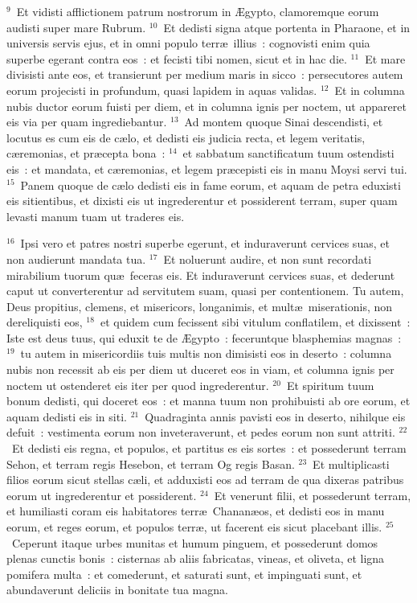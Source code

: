 ${}^{9}$~Et vidisti afflictionem patrum nostrorum in \AE gypto, clamoremque eorum audisti super mare Rubrum.
${}^{10}$~Et dedisti signa atque portenta in Pharaone, et in universis servis ejus, et in omni populo terr\ae\ illius~: cognovisti enim quia superbe egerant contra eos~: et fecisti tibi nomen, sicut et in hac die.
${}^{11}$~Et mare divisisti ante eos, et transierunt per medium maris in sicco~: persecutores autem eorum projecisti in profundum, quasi lapidem in aquas validas.
${}^{12}$~Et in columna nubis ductor eorum fuisti per diem, et in columna ignis per noctem, ut appareret eis via per quam ingrediebantur.
${}^{13}$~Ad montem quoque Sinai descendisti, et locutus es cum eis de c\ae lo, et dedisti eis judicia recta, et legem veritatis, c\ae remonias, et pr\ae cepta bona~:
${}^{14}$~et sabbatum sanctificatum tuum ostendisti eis~: et mandata, et c\ae remonias, et legem pr\ae cepisti eis in manu Moysi servi tui.
${}^{15}$~Panem quoque de c\ae lo dedisti eis in fame eorum, et aquam de petra eduxisti eis sitientibus, et dixisti eis ut ingrederentur et possiderent terram, super quam levasti manum tuam ut traderes eis.


${}^{16}$~Ipsi vero et patres nostri superbe egerunt, et induraverunt cervices suas, et non audierunt mandata tua.
${}^{17}$~Et noluerunt audire, et non sunt recordati mirabilium tuorum qu\ae\ feceras eis. Et induraverunt cervices suas, et dederunt caput ut converterentur ad servitutem suam, quasi per contentionem. Tu autem, Deus propitius, clemens, et misericors, longanimis, et mult\ae\ miserationis, non dereliquisti eos,
${}^{18}$~et quidem cum fecissent sibi vitulum conflatilem, et dixissent~: Iste est deus tuus, qui eduxit te de \AE gypto~: feceruntque blasphemias magnas~:
${}^{19}$~tu autem in misericordiis tuis multis non dimisisti eos in deserto~: columna nubis non recessit ab eis per diem ut duceret eos in viam, et columna ignis per noctem ut ostenderet eis iter per quod ingrederentur.
${}^{20}$~Et spiritum tuum bonum dedisti, qui doceret eos~: et manna tuum non prohibuisti ab ore eorum, et aquam dedisti eis in siti.
${}^{21}$~Quadraginta annis pavisti eos in deserto, nihilque eis defuit~: vestimenta eorum non inveteraverunt, et pedes eorum non sunt attriti.
${}^{22}$~Et dedisti eis regna, et populos, et partitus es eis sortes~: et possederunt terram Sehon, et terram regis Hesebon, et terram Og regis Basan.
${}^{23}$~Et multiplicasti filios eorum sicut stellas c\ae li, et adduxisti eos ad terram de qua dixeras patribus eorum ut ingrederentur et possiderent.
${}^{24}$~Et venerunt filii, et possederunt terram, et humiliasti coram eis habitatores terr\ae\ Chanan\ae os, et dedisti eos in manu eorum, et reges eorum, et populos terr\ae , ut facerent eis sicut placebant illis.
${}^{25}$~Ceperunt itaque urbes munitas et humum pinguem, et possederunt domos plenas cunctis bonis~: cisternas ab aliis fabricatas, vineas, et oliveta, et ligna pomifera multa~: et comederunt, et saturati sunt, et impinguati sunt, et abundaverunt deliciis in bonitate tua magna.


